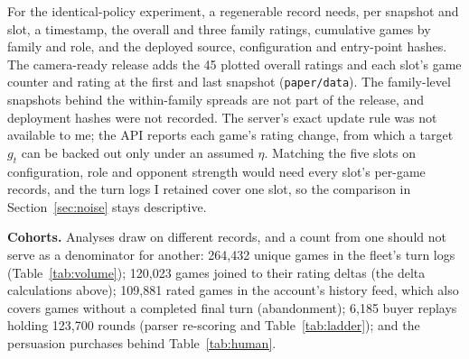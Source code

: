 \documentclass{article}
\begin{document}
For the identical-policy experiment, a regenerable record needs, per snapshot
and slot, a timestamp, the overall and three family ratings, cumulative games by
family and role, and the deployed source, configuration and entry-point hashes.
The camera-ready release adds the 45 plotted overall ratings and each slot's game
counter and rating at the first and last snapshot
(\texttt{paper/data}). The family-level snapshots behind the
within-family spreads are not part of the release, and deployment hashes were
not recorded. The server's exact update rule was not available to me; the API
reports each game's rating change, from which a target $g_t$ can be backed out
only under an assumed $\eta$. Matching the five slots on configuration, role and
opponent strength would need every slot's per-game records, and the turn logs I
retained cover one slot, so the comparison in Section~\ref{sec:noise} stays
descriptive.

\textbf{Cohorts.} Analyses draw on different records, and a count from one
should not serve as a denominator for another: 264,432 unique games in the
fleet's turn logs (Table~\ref{tab:volume}); 120,023 games joined to their rating
deltas (the delta calculations above); 109,881 rated games in the account's
history feed, which also covers games without a completed final turn
(abandonment); 6,185 buyer replays holding 123,700 rounds (parser re-scoring and
Table~\ref{tab:ladder}); and the persuasion purchases behind
Table~\ref{tab:human}.
\end{document}
